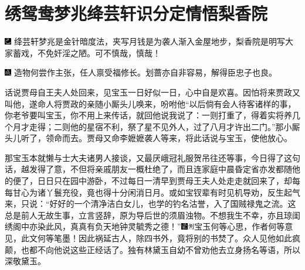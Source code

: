 

\chapter{绣鸳鸯梦兆绛芸轩\hspace{.5em}识分定情悟梨香院}

{\includegraphics[width=3mm]{../Images/00003}  \kaishu 绛芸轩梦兆是金针暗度法，夹写月钱是为袭人渐入金屋地步，梨香院是明写大家蓄戏，不免奸淫之陋。可不慎哉，慎哉！}

{\includegraphics[width=3mm]{../Images/00005}  \kaishu 造物何尝作主张，任人禀受福修长。划蔷亦自非容易，解得臣忠子也良。}

话说贾母自王夫人处回来，见宝玉一日好似一日，心中自是欢喜。因怕将来贾政又叫他，遂命人将贾政的亲随小厮头儿唤来，吩咐他``以后倘有会人待客诸样的事，你老爷要叫宝玉，你不用上来传话，就回他说我说了：一则打重了，得着实将养几个月才走得；二则他的星宿不利，祭了星不见外人，过了八月才许出二门。''那小厮头儿听了，领命而去。贾母又命李嬷嬷袭人等来，将此话说与宝玉，使他放心。

那宝玉本就懒与士大夫诸男人接谈，又最厌峨冠礼服贺吊往还等事，今日得了这句话，越发得了意，不但将亲戚朋友一概杜绝了，而且连家庭中晨昏定省亦发都随他的便了，日日只在园中游卧，不过每日一清早到贾母王夫人处走走就回来了，却每每甘心为诸丫鬟充役，竟也得十分闲消日月。或如宝钗辈有时见机导劝，反生起气来，只说：``好好的一个清净洁白女儿，也学的钓名沽誉，入了国贼禄鬼之流。这总是前人无故生事，立言竖辞，原为导后世的须眉浊物。不想我生不幸，亦且琼闺绣阁中亦染此风，真真有负天地钟灵毓秀之德！''{\includegraphics[width=3mm]{../Images/00006}\includegraphics[width=3mm]{../Images/00011}\footnotesize \kaishu 宝玉何等心思，作者何等意见，此文何等笔墨！}因此祸延古人，除四书外，竟将别的书焚了。众人见他如此疯颠，也都不向他说这些正经话了。独有林黛玉自幼不曾劝他去立身扬名等语，所以深敬黛玉。

